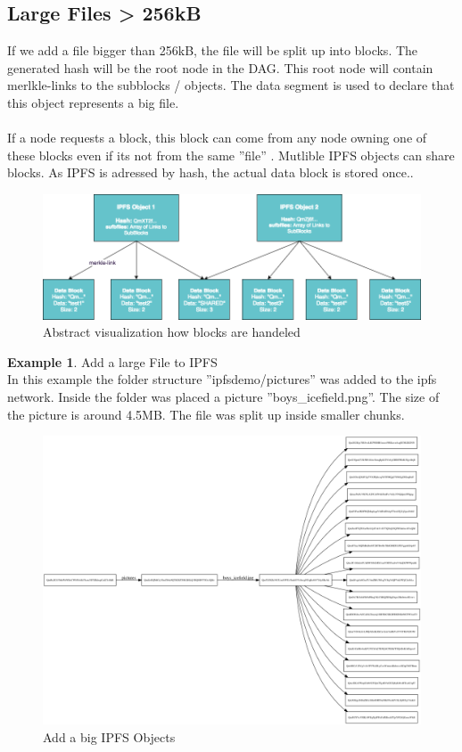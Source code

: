 \documentclass[a4paper,11pt, oneside]{report}
\theoremstyle{definition}
\newtheorem{exmp}{Example}[subsection]
\begin{document}
\subsection{Large Files > 256kB}
If we add a file bigger than 256kB, the file will be split up into blocks. The generated hash will be the root node in the DAG. This root node will contain merlkle-links to the subblocks / objects. The data segment is used to declare that this object represents a big file.\\ \\
If a node requests a block, this block can come from any node owning one of these blocks even if its not from the same ''file'' \cite{fileblock}. Mutlible IPFS objects can share blocks. As IPFS is adressed by hash, the actual data block is stored once.\cite{fileblock2}. \\[0.3cm]
\begin{figure}[H]
\centering
\includegraphics[width=\textwidth]{img/ipfs-fileblocks-big.png}
\caption[Big Object \& Blocks]{Abstract visualization how blocks are handeled}
\end{figure}

\newpage
\begin{exmp}Add a large File to IPFS \\
In this example the folder structure ''ipfsdemo/pictures'' was added to the ipfs network. Inside the folder was placed a picture ''boys\_icefield.png''. The size of the picture is around 4.5MB. The file was split up inside smaller chunks.
\begin{figure}[H]
\centering
\includegraphics[width=\textwidth]{img/ipfs-object-example.png}
\caption[IPFS Objects Example]{Add a big IPFS Objects}
\end{figure}
\end{exmp}
\end{document}
